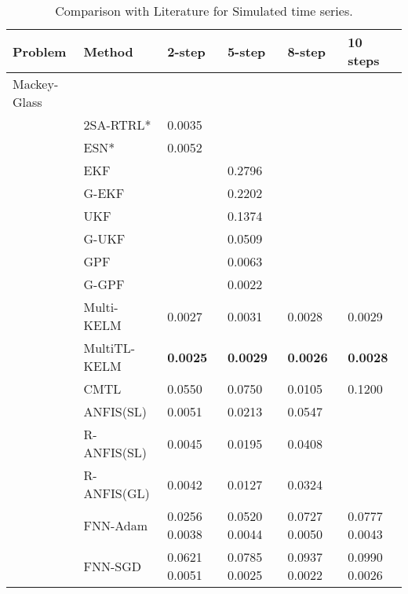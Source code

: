 \documentclass{ieeeaccess}
\begin{document}
 
\begin{table*}[htbp!]

\centering
 \small
 \caption{Comparison with Literature for Simulated time series. }
  
\label{tab:Simulated}
\begin{tabular}{llllll}

\hline
Problem & Method & 2-step & 5-step & 8-step & 10 steps\\
 \hline
 \hline
Mackey-Glass & &  	   &	& &\\
 


 &2SA-RTRL* \cite{chang2012reinforced}&  0.0035  	  &	 & & \\



 &ESN*\cite{chang2012reinforced}&    0.0052	&   	&   &\\
 &EKF\cite{Wu2013AMC}&     	&   0.2796	 &   &\\
 &G-EKF \cite{Wu2013AMC}&     	&   0.2202	 &   &\\
  &UKF \cite{Wu2013AMC}&     	&   	 0.1374&   &\\
  &G-UKF \cite{Wu2013AMC}&     	&   	0.0509&  & \\
 &GPF\cite{Wu2013AMC} &     	&   	0.0063&   &\\

 &G-GPF\cite{Wu2013AMC} &     	&   0.0022	&   &\\

&Multi-KELM\cite{YE2019227} &		0.0027&0.0031&0.0028&0.0029\\
&MultiTL-KELM\cite{YE2019227} &	\textbf{0.0025}&	\textbf{0.0029}&\textbf{0.0026}&\textbf{0.0028}\\
&CMTL \cite{chandra2017CMTLMulti}&  0.0550 & 	0.0750 & 0.0105 & 0.1200	\\





&ANFIS(SL) \cite{ZHOU2019343} &0.0051 &0.0213 & 0.0547 & \\
&R-ANFIS(SL) \cite{ZHOU2019343}&0.0045 &0.0195  &	0.0408 & \\
&R-ANFIS(GL) \cite{ZHOU2019343}&0.0042 & 	0.0127 & 0.0324 & \\

&FNN-Adam &   0.0256	0.0038   	&   0.0520	0.0044     &0.0727	0.0050	       &0.0777	0.0043\\

&FNN-SGD  &     0.0621	0.0051 	&  0.0785	0.0025       &0.0937	0.0022	      &0.0990	0.0026\\


\end{tabular}
\end{table*}
\end{document}
